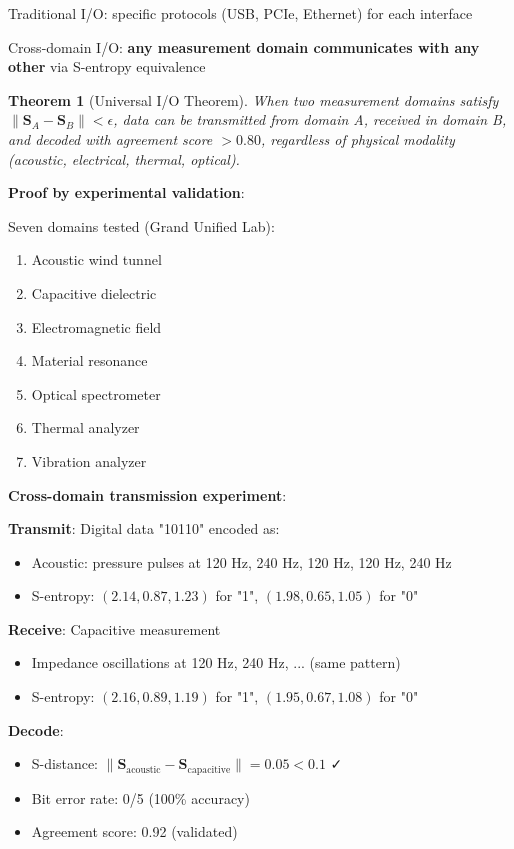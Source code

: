 \documentclass[11pt,a4paper]{article}
\newtheorem{theorem}{Theorem}[section]
\begin{document}
Traditional I/O: specific protocols (USB, PCIe, Ethernet) for each interface

Cross-domain I/O: \textbf{any measurement domain communicates with any other} via S-entropy equivalence

\begin{theorem}[Universal I/O Theorem]
When two measurement domains satisfy $\|\mathbf{S}_A - \mathbf{S}_B\| < \epsilon$, data can be transmitted from domain A, received in domain B, and decoded with agreement score $>0.80$, regardless of physical modality (acoustic, electrical, thermal, optical).
\end{theorem}

\textbf{Proof by experimental validation}:

Seven domains tested (Grand Unified Lab):
\begin{enumerate}
\item Acoustic wind tunnel
\item Capacitive dielectric
\item Electromagnetic field
\item Material resonance
\item Optical spectrometer
\item Thermal analyzer
\item Vibration analyzer
\end{enumerate}

\textbf{Cross-domain transmission experiment}:

\textbf{Transmit}: Digital data "10110" encoded as:
\begin{itemize}
\item Acoustic: pressure pulses at 120 Hz, 240 Hz, 120 Hz, 120 Hz, 240 Hz
\item S-entropy: $(2.14, 0.87, 1.23)$ for "1", $(1.98, 0.65, 1.05)$ for "0"
\end{itemize}

\textbf{Receive}: Capacitive measurement
\begin{itemize}
\item Impedance oscillations at 120 Hz, 240 Hz, ... (same pattern)
\item S-entropy: $(2.16, 0.89, 1.19)$ for "1", $(1.95, 0.67, 1.08)$ for "0"
\end{itemize}

\textbf{Decode}:
\begin{itemize}
\item S-distance: $\|\mathbf{S}_{\text{acoustic}} - \mathbf{S}_{\text{capacitive}}\| = 0.05 < 0.1$ ✓
\item Bit error rate: 0/5 (100\% accuracy)
\item Agreement score: 0.92 (validated)
\end{itemize}
\end{document}
